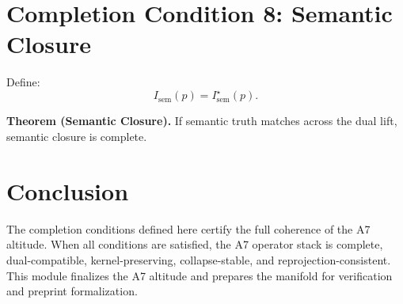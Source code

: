 \documentclass[11pt]{article}
\begin{document}
\section{Completion Condition 8: Semantic Closure}

Define:
\[
I_{\mathrm{sem}}(p) = I^\star_{\mathrm{sem}}(p).
\]

\textbf{Theorem (Semantic Closure).}
If semantic truth matches across the dual lift, semantic closure is complete.

\section{Conclusion}

The completion conditions defined here certify the full coherence of the A7
altitude. When all conditions are satisfied, the A7 operator stack is complete,
dual-compatible, kernel-preserving, collapse-stable, and reprojection-consistent.
This module finalizes the A7 altitude and prepares the manifold for verification
and preprint formalization.
\end{document}
